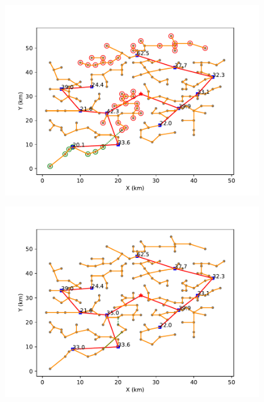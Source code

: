 \documentclass{cumcmthesis}
\begin{document}
  \begin{figure}[!h]
    \centering
    \begin{minipage}[c]{0.45\textwidth}
        \centering
        \includegraphics[width=0.99\textwidth]{figure/pipline_graft_connection_4.pdf}
        \label{fig:pipline_graft_connection_4}
    \end{minipage}
    \begin{minipage}[c]{0.45\textwidth}
        \centering
        \includegraphics[width=0.99\textwidth]{figure/pipline_graft_cut_4.pdf}
        \label{fig:pipline_graft_cut_4}
    \end{minipage}
  \end{figure}
  
\end{document}
